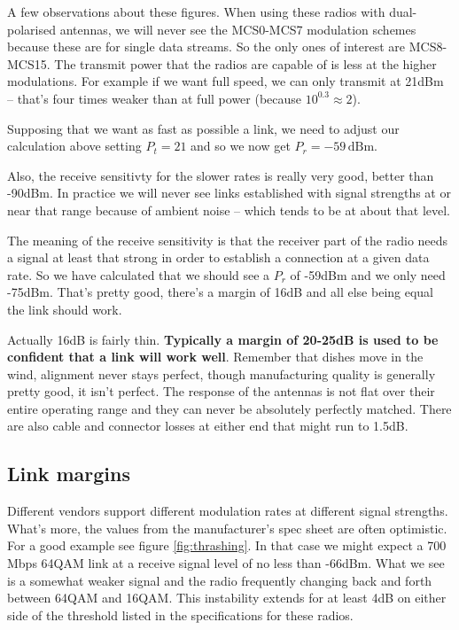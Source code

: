 A few observations about these figures. When using these radios with
dual-polarised antennas, we will never see the MCS0-MCS7 modulation
schemes because these are for single data streams. So the only ones of
interest are MCS8-MCS15. The transmit power that the radios are
capable of is less at the higher modulations. For example if we want
full speed, we can only transmit at 21dBm -- that's four
times weaker than at full power (because $10^{0.3} \approx 2$). 

Supposing that we want as fast as possible a link, we need to adjust
our calculation above setting $P_t = 21$ and so we now get
$P_r = -59\, \mathrm{dBm}$.

Also, the receive sensitivty for the slower rates is really very good,
better than -90dBm. In practice we will never see links
established with signal strengths at or near that range because of
ambient noise -- which tends to be at about that level.

The meaning of the receive sensitivity is that the receiver part of
the radio needs a signal at least that strong in order to establish a
connection at a given data rate. So we have calculated that we should
see a $P_r$ of -59dBm and we only need -75dBm.
That's pretty good, there's a margin of 16dB and all
else being equal the link should work.

Actually 16dB is fairly thin. \textbf{Typically a margin
  of 20-25dB is used to be confident that a link will
  work well}. Remember that dishes move in the wind, alignment never
stays perfect, though manufacturing quality is generally pretty good,
it isn't perfect. The response of the antennas is not flat over their
entire operating range and they can never be absolutely perfectly
matched. There are also cable and connector losses at either end that
might run to 1.5dB.

\subsection{Link margins}
\label{sec:margins}

Different vendors support different modulation rates at different
signal strengths. What's more, the values from the manufacturer's spec
sheet are often optimistic. For a good example see figure
\ref{fig:thrashing}. In that case we might expect a 700 Mbps 64QAM
link at a receive signal level of no less than -66dBm. What we see is
a somewhat weaker signal and the radio frequently changing back and
forth between 64QAM and 16QAM. This instability extends for at least
4dB on either side of the threshold listed in the specifications for
these radios.

